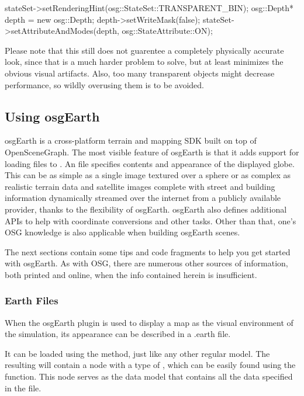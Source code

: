 \begin{cpp}
stateSet->setRenderingHint(osg::StateSet::TRANSPARENT_BIN);
osg::Depth* depth = new osg::Depth;
depth->setWriteMask(false);
stateSet->setAttributeAndModes(depth, osg::StateAttribute::ON);
\end{cpp}

Please note that this still does not guarentee a completely physically accurate
look, since that is a much harder problem to solve, but at least minimizes the
obvious visual artifacts. Also, too many transparent objects might decrease
performance, so wildly overusing them is to be avoided.


\subsection{Using osgEarth}
\label{sec:graphics:using-osgearth}

osgEarth is a cross-platform terrain and mapping SDK built on top of OpenSceneGraph.
The most visible feature of osgEarth is that it adds support for loading 
files to . An  file specifies contents and
appearance of the displayed globe. This can be as simple as a single image
textured over a sphere or as complex as realistic terrain data and
satellite images complete with street and building information dynamically
streamed over the internet from a publicly available provider, thanks to
the flexibility of osgEarth. osgEarth also defines additional APIs
to help with coordinate conversions and other tasks. Other than that,
one's OSG knowledge is also applicable when building osgEarth scenes.

The next sections contain some tips and code fragments to help you get
started with osgEarth. As with OSG, there are numerous other sources of
information, both printed and online, when the info contained herein
is insufficient.


\subsubsection{Earth Files}
\label{sec:graphics:earth-files}

When the osgEarth plugin is used to display a map as the visual environment
of the simulation, its appearance can be described in a .earth file.

It can be loaded using the  method, just like any
other regular model. The resulting  will contain a node with a
type of , which can be easily found using the
 function. This node serves as the
data model that contains all the data specified in the  file.

